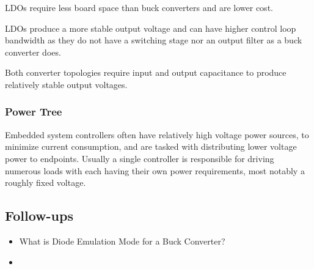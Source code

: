 \documentclass[main.tex]{subfiles}
\begin{document}
LDOs require less board space than buck converters and are lower cost. 

LDOs produce a more stable output voltage and can have higher control loop bandwidth as they do not have a switching stage nor an output filter as a buck converter does. 

Both converter topologies require input and output capacitance to produce relatively stable output voltages.

\subsubsection{Power Tree}
Embedded system controllers often have relatively high voltage power sources, to minimize current consumption, and are tasked with distributing lower voltage power to endpoints. Usually a single controller is responsible for driving numerous loads with each having their own power requirements, most notably a roughly fixed voltage. 

\subsection{Follow-ups}
\begin{itemize}
    \item What is Diode Emulation Mode for a Buck Converter?
    \item 
\end{itemize}
\end{document}
